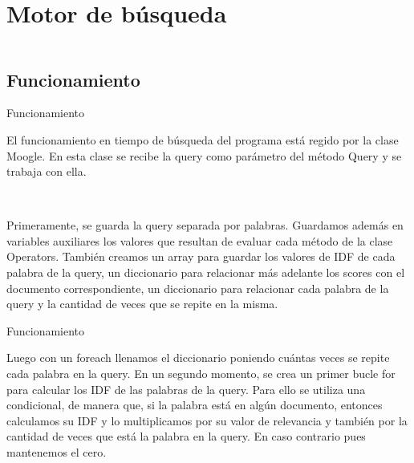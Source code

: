 \section{Motor de búsqueda}
\begin{frame}
  \begin{columns}[t]
      \begin{column}{.5\textwidth}
        \tableofcontents[sections={1-2},currentsection]
      \end{column}
      \begin{column}{.5\textwidth}
        \tableofcontents[sections={3-4},currentsection]
      \end{column}
  \end{columns}
\end{frame}

\subsection{Funcionamiento}
\begin{frame}[fragile]{Funcionamiento}

  El funcionamiento en tiempo de búsqueda del programa está regido por la clase Moogle. En esta clase se recibe
  la query como parámetro del método Query y se trabaja con ella.

\pause


\ 


  Primeramente, se guarda la query separada por palabras. Guardamos además en variables auxiliares 
  los valores que resultan de evaluar cada método de la clase Operators. También creamos un array para guardar los
  valores de IDF de cada palabra de la query, un diccionario para relacionar más adelante los scores con el documento
  correspondiente, un diccionario para relacionar cada palabra de la query y la cantidad de veces que se repite en la
  misma. 
  
\end{frame}
  
\begin{frame}[fragile]{Funcionamiento}

  Luego con un foreach llenamos el diccionario poniendo cuántas veces se repite cada palabra en la query.
  En un segundo momento, se crea un primer bucle for para calcular los IDF de las palabras de la query. Para
  ello se utiliza una condicional, de manera que, si la palabra está en algún documento, entonces calculamos su IDF
  y lo multiplicamos por su valor de relevancia y también por la cantidad de veces que está la palabra en la query. 
  En caso contrario pues mantenemos el cero.

\end{frame}

